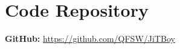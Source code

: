 \appendix
\appendixpage
\addappheadtotoc

\section{Code Repository}

\textbf{GitHub:} \url{https://github.com/QFSW/JiTBoy}